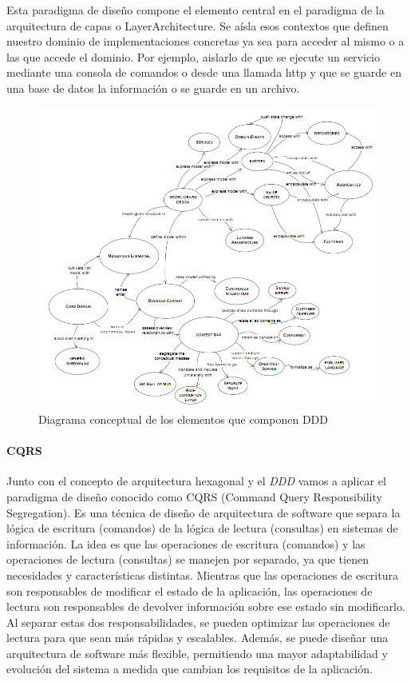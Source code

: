 Esta paradigma de diseño compone el elemento central en el paradigma de la arquitectura de capas o \gls{LayerArchitecture}.
Se aísla esos contextos que definen nuestro dominio de implementaciones concretas ya sea para acceder al mismo o a las que accede el dominio.
Por ejemplo, aislarlo de que se ejecute un servicio mediante una consola de comandos o desde una llamada http y que se guarde en una base de datos la información o se guarde en un archivo.

\begin{figure}[H]
    \centering
    \includegraphics[height=0.6\textheight]{./part/Proyecto_ejecutivo/memoria_descriptiva/infoPreviaAntecedentes/img/DomainDrivenDesignReference}
    \caption{Diagrama conceptual de los elementos que componen DDD\cite{EricEvans2003DDTC}}\label{fig:DomainDrivenDesignReference}
\end{figure}

\paragraph{CQRS}

Junto con el concepto de arquitectura hexagonal y el \textit{DDD} vamos a aplicar el paradigma de diseño conocido como \gls{CQRS} (Command Query Responsibility Segregation).
Es una técnica de diseño de arquitectura de software que separa la lógica de escritura (comandos) de la lógica de lectura (consultas) en sistemas de información.
La idea es que las operaciones de escritura (comandos) y las operaciones de lectura (consultas) se manejen por separado, ya que tienen necesidades y características distintas.
Mientras que las operaciones de escritura son responsables de modificar el estado de la aplicación, las operaciones de lectura son responsables de devolver información sobre ese estado sin modificarlo.
Al separar estas dos responsabilidades, se pueden optimizar las operaciones de lectura para que sean más rápidas y escalables.
Además, se puede diseñar una arquitectura de software más flexible, permitiendo una mayor adaptabilidad y evolución del sistema a medida que cambian los requisitos de la aplicación.

